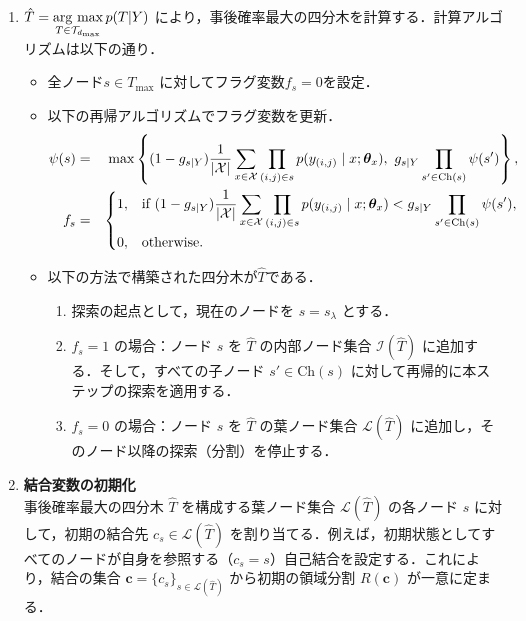\documentclass{jsarticle}
\theoremstyle{definition}
\newcommand{\argmax}{\mathop{\rm arg~max}}
\begin{document}
\begin{enumerate}
  \item $\displaystyle \hat{T} = \argmax_{T \in \mathcal{T}_{d_{\mathrm{max}}}} p(T|Y)$ により，事後確率最大の四分木を計算する．計算アルゴリズムは以下の通り．
    \begin{itemize}
      \item 全ノード$s\in T_{\mathrm{max}}$ に対してフラグ変数$f_s = 0$を設定． 
      \item 以下の再帰アルゴリズムでフラグ変数を更新．
      \begin{eqnarray}
        \psi(s) &=& \max \left\{ (1 - g_{s \mid Y})\frac{1}{|\mathcal{X}|} \sum_{x \in \mathcal{X}} \prod_{(i,j) \in s} p(y_{(i,j)} \mid x; \bm{\theta}_x), \ g_{s \mid Y} \prod_{s' \in \mathrm{Ch}(s)} \psi(s') \right\}, \\
        f_s &=& 
        \begin{dcases}
          1, & \text{if } (1 - g_{s \mid Y})\frac{1}{|\mathcal{X}|} \sum_{x \in \mathcal{X}} \prod_{(i,j) \in s} p(y_{(i,j)} \mid x; \bm{\theta}_x) < g_{s \mid Y} \prod_{s' \in \mathrm{Ch}(s)} \psi(s'), \\
          0, & \text{otherwise}.
        \end{dcases}
      \end{eqnarray}
      \item 以下の方法で構築された四分木が$\hat{T}$である．
      \begin{enumerate}
        \item 探索の起点として，現在のノードを $s = s_\lambda$ とする．
        \item $f_s = 1$ の場合：ノード $s$ を $\hat{T}$ の内部ノード集合 $\mathcal{I}(\hat{T})$ に追加する．そして，すべての子ノード $s' \in \mathrm{Ch}(s)$ に対して再帰的に本ステップの探索を適用する．
        \item $f_s = 0$ の場合：ノード $s$ を $\hat{T}$ の葉ノード集合 $\mathcal{L}(\hat{T})$ に追加し，そのノード以降の探索（分割）を停止する．
      \end{enumerate}
  \end{itemize}
\item \textbf{結合変数の初期化}\\
  事後確率最大の四分木 $\hat{T}$ を構成する葉ノード集合 $\mathcal{L}(\hat{T})$ の各ノード $s$ に対して，初期の結合先 $c_s \in \mathcal{L}(\hat{T})$ を割り当てる．例えば，初期状態としてすべてのノードが自身を参照する（$c_s = s$）自己結合を設定する．これにより，結合の集合 $\bm{c} = \{c_s\}_{s \in \mathcal{L}(\hat{T})}$ から初期の領域分割 $R(\bm{c})$ が一意に定まる．


\end{enumerate}
\end{document}

